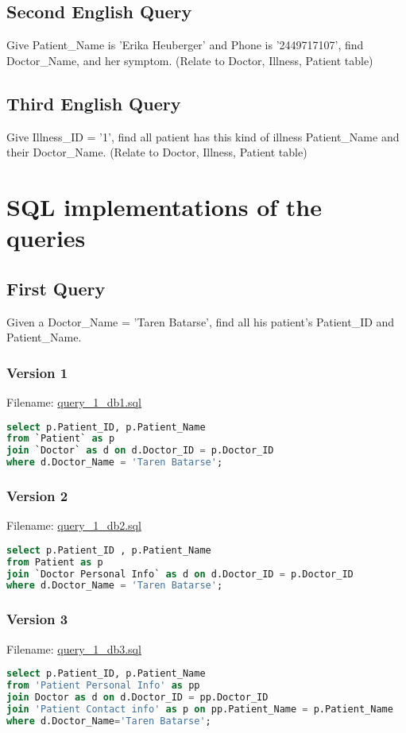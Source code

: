 \documentclass[12pt,arial]{article}
\begin{document}
\subsection{Second English Query}
Give Patient\_Name is 'Erika Heuberger' and Phone is '2449717107', find Doctor\_Name, and her symptom.
(Relate to Doctor, Illness, Patient table)
\subsection{Third English Query}
Give Illness\_ID = '1', find all patient has this kind of illness Patient\_Name and their Doctor\_Name.
(Relate to Doctor, Illness, Patient table)


\section{SQL implementations of the queries}
\subsection{First Query}
Given a Doctor\_Name = 'Taren Batarse', find all his patient's Patient\_ID and Patient\_Name.
\subsubsection{Version 1}
Filename: \url{query_1_db1.sql}
\begin{lstlisting}[language=SQL]
select p.Patient_ID, p.Patient_Name
from `Patient` as p
join `Doctor` as d on d.Doctor_ID = p.Doctor_ID
where d.Doctor_Name = 'Taren Batarse';
\end{lstlisting}
\subsubsection{Version 2}
Filename: \url{query_1_db2.sql}
\begin{lstlisting}[language=SQL]
select p.Patient_ID , p.Patient_Name
from Patient as p
join `Doctor Personal Info` as d on d.Doctor_ID = p.Doctor_ID
where d.Doctor_Name = 'Taren Batarse';
\end{lstlisting}
\subsubsection{Version 3}
Filename: \url{query_1_db3.sql}
\begin{lstlisting}[language=SQL]
select p.Patient_ID, p.Patient_Name 
from 'Patient Personal Info' as pp
join Doctor as d on d.Doctor_ID = pp.Doctor_ID
join 'Patient Contact info' as p on pp.Patient_Name = p.Patient_Name
where d.Doctor_Name='Taren Batarse';
\end{lstlisting}
\end{document}
